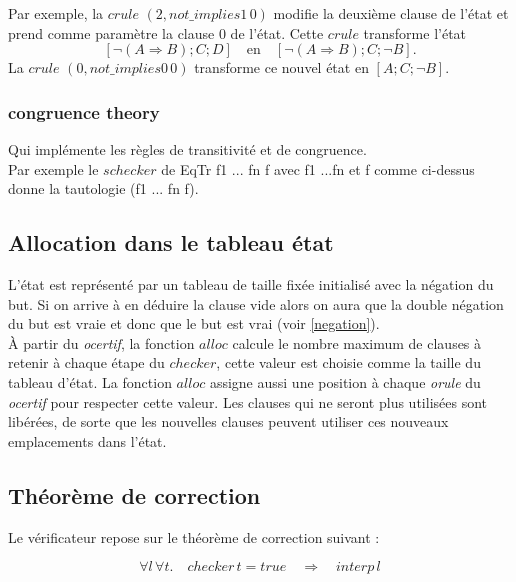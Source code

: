 \documentclass[11pt]{article}
\begin{document}
Par exemple, la $crule$ $(2, not\_implies1 \, 0)$ modifie la deuxième clause de l'état et prend comme paramètre la clause $0$ de l'état. Cette $crule$ transforme l'état 
\[    [\neg (A \Rightarrow B);  C; D] \quad \text{en} \quad [\neg (A \Rightarrow B);  C; \neg B]. \]
La $crule$ $(0, not\_implies0 \, 0)$ transforme ce nouvel état en $[A; C; \neg B]$. \\

\subsubsection{congruence theory}

Qui implémente les règles de transitivité et de congruence. \\

Par exemple le $schecker$ de EqTr f1 ... fn f avec f1 ...fn et f comme ci-dessus donne la tautologie (f1 \/ ... \/ fn \/ f). 

\subsection{Allocation dans le tableau état} \label{alloc}
L'état est représenté par un tableau de taille fixée initialisé avec la négation du but. Si on arrive à en déduire la clause vide alors on aura que la double négation du but est vraie et donc que le but est vrai (voir \ref{negation}). \\

À partir du \textit{ocertif}, la fonction $alloc$ calcule le nombre maximum de clauses à retenir à chaque étape du $checker$, cette valeur est choisie comme la taille du tableau d'état. La fonction $alloc$ assigne aussi une position à chaque \textit{orule} du \textit{ocertif} pour respecter cette valeur. Les clauses qui ne seront plus utilisées sont libérées, de sorte que les nouvelles clauses peuvent utiliser ces nouveaux emplacements dans l'état. \\


\subsection{Théorème de correction}

Le vérificateur repose sur le théorème de correction suivant :

\[ \forall l \, \forall t. \quad checker \, t = true \quad \Rightarrow \quad interp \, l \]
\end{document}
